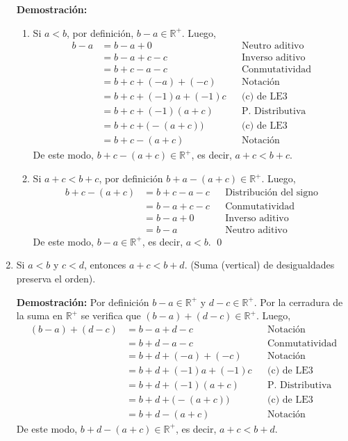 \documentclass[11pt]{article}
\newcommand{\R}{\mathbb{R}}
\begin{document}
\begin{enumerate}[label=\alph*)]
    \textbf{Demostración:} \begin{enumerate}[label=\roman*)]
    \item Si $a<b$, por definición, $b-a \in \R^+$. Luego, \begin{align*}
        b - a &= b -a + 0 && \text{Neutro aditivo}\\
        &= b-a+c-c && \text{Inverso aditivo}\\
        &= b+c-a-c && \text{Conmutatividad}\\
        &= b+c+(-a)+(-c) && \text{Notación}\\
        &= b+c+(-1)a+(-1)c && \text{(c) de LE3}\\
        &= b+c+(-1)(a+c) && \text{P. Distributiva}\\
        &= b+c+\big(-(a+c)\big) && \text{(c) de LE3}\\
        &= b+c-(a+c) && \text{Notación}
        \end{align*} De este modo, $b+c-(a+c)\in \R^+$, es decir, $a+c<b+c$.
    \item Si $a+c<b+c$, por definición $b+a-(a+c)\in \R^+$. Luego, \begin{align*}
        b+c-(a+c) &= b+c-a-c && \text{Distribución del signo}\\
        &= b-a+c-c && \text{Conmutatividad}\\
        &= b-a+0 && \text{Inverso aditivo}\\
        &= b-a && \text{Neutro aditivo}
    \end{align*} De este modo, $b-a\in \R^+$, es decir, $a<b$. \qed
    \end{enumerate}

    \item Si $a<b$ y $c < d$, entonces $a+c<b+d$. (Suma (vertical) de desigualdades preserva el orden).
    
    \textbf{Demostración:} Por definición $b-a\in \R^+$ y $d-c\in \R^+$. Por la cerradura de la suma en $\R^+$ se verifica que $(b-a)+(d-c) \in \R^+$. Luego, \begin{align*}
        (b-a)+(d-c) &= b-a+d-c && \text{Notación}\\
        &= b+d-a-c && \text{Conmutatividad}\\
        &= b+d+(-a)+(-c) && \text{Notación}\\
        &= b+d+(-1)a+(-1)c && \text{(c) de LE3}\\
        &= b+d+ (-1) (a + c) && \text{P. Distributiva}\\
        &= b+d +\big(-(a+c) \big) && \text{(c) de LE3}\\
        &= b+d - (a+c) && \text{Notación}
        \end{align*}
    De este modo, $b+d-(a+c)\in \R^+$, es decir, $a+c<b+d$.


\end{enumerate}
\end{document}
